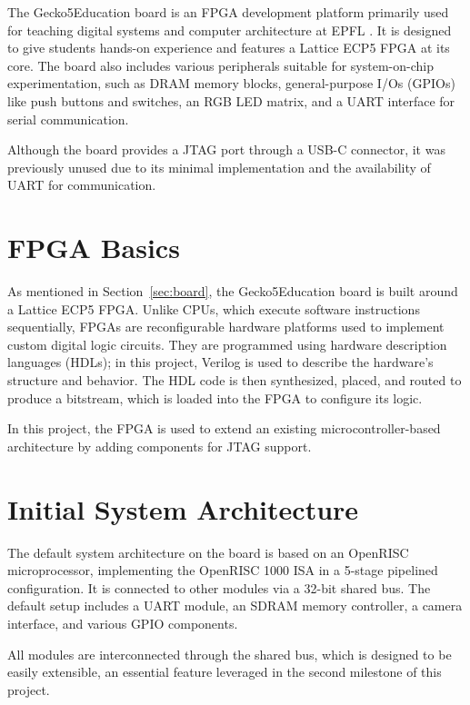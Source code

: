 \documentclass[a4paper,11pt,oneside]{report}
\newcommand{\boardName}{Gecko5Education \xspace}
\begin{document}
The \boardName board is an FPGA development platform primarily  
used for teaching digital systems and computer architecture at EPFL \cite{noauthor_logisim-evolution/gecko5education_2025}.  
It is designed to give students hands-on experience and features  
a Lattice ECP5 FPGA at its core.  
The board also includes various peripherals suitable for system-on-chip experimentation,  
such as DRAM memory blocks, general-purpose I/Os (GPIOs) like push buttons and switches,  
an RGB LED matrix, and a UART interface for serial communication.  

Although the board provides a JTAG port through a USB-C connector,  
it was previously unused due to its minimal implementation and  
the availability of UART for communication.  

\section{FPGA Basics}

As mentioned in Section~\ref{sec:board}, the \boardName board is built around a Lattice ECP5 FPGA.
Unlike CPUs, which execute software instructions sequentially, FPGAs are reconfigurable hardware platforms used to implement custom digital logic circuits.
They are programmed using hardware description languages (HDLs); in this project, Verilog is used to describe the hardware’s structure and behavior.
The HDL code is then synthesized, placed, and routed to produce a bitstream, which is loaded into the FPGA to configure its logic.

In this project, the FPGA is used to extend an existing microcontroller-based architecture by adding components for JTAG support. 

\section{Initial System Architecture}
\label{sec:arch}

The default system architecture on the board is based on an OpenRISC microprocessor, implementing the OpenRISC 1000 ISA in a 5-stage pipelined configuration.
It is connected to other modules via a 32-bit shared bus.
The default setup includes a UART module, an SDRAM memory controller, a camera interface, and various GPIO components.

All modules are interconnected through the shared bus, which is designed to be easily extensible, an essential feature leveraged in the second milestone of this project.
\end{document}

